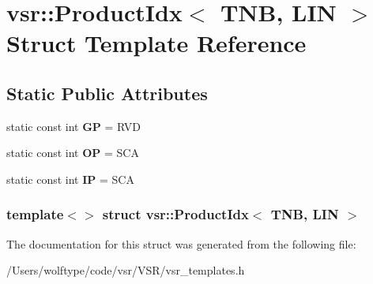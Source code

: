 \hypertarget{structvsr_1_1_product_idx_3_01_t_n_b_00_01_l_i_n_01_4}{\section{vsr\-:\-:Product\-Idx$<$ T\-N\-B, L\-I\-N $>$ Struct Template Reference}
\label{structvsr_1_1_product_idx_3_01_t_n_b_00_01_l_i_n_01_4}
}
\subsection*{Static Public Attributes}
\begin{DoxyCompactItemize}
\item 
\hypertarget{structvsr_1_1_product_idx_3_01_t_n_b_00_01_l_i_n_01_4_ae08e95879f35a3786e5cb5d21457b816}{static const int {\bfseries G\-P} = R\-V\-D}\label{structvsr_1_1_product_idx_3_01_t_n_b_00_01_l_i_n_01_4_ae08e95879f35a3786e5cb5d21457b816}

\item 
\hypertarget{structvsr_1_1_product_idx_3_01_t_n_b_00_01_l_i_n_01_4_a584dac07f56129e54678d15f8f5fe291}{static const int {\bfseries O\-P} = S\-C\-A}\label{structvsr_1_1_product_idx_3_01_t_n_b_00_01_l_i_n_01_4_a584dac07f56129e54678d15f8f5fe291}

\item 
\hypertarget{structvsr_1_1_product_idx_3_01_t_n_b_00_01_l_i_n_01_4_a973815c6f468625591bf291fa91e57cf}{static const int {\bfseries I\-P} = S\-C\-A}\label{structvsr_1_1_product_idx_3_01_t_n_b_00_01_l_i_n_01_4_a973815c6f468625591bf291fa91e57cf}

\end{DoxyCompactItemize}
\subsubsection*{template$<$$>$ struct vsr\-::\-Product\-Idx$<$ T\-N\-B, L\-I\-N $>$}



The documentation for this struct was generated from the following file\-:\begin{DoxyCompactItemize}
\item 
/\-Users/wolftype/code/vsr/\-V\-S\-R/vsr\-\_\-templates.\-h\end{DoxyCompactItemize}
